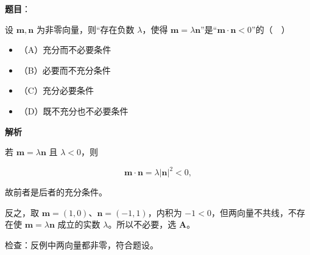 \begin{answer}

\textbf{题目}：

设 $\boldsymbol m,\boldsymbol n$ 为非零向量，则“存在负数 $\lambda$，使得 $\boldsymbol m=\lambda\boldsymbol n$”是“$\boldsymbol m\cdot\boldsymbol n<0$”的（　）

\begin{itemize}
\item （A）充分而不必要条件
\item （B）必要而不充分条件
\item （C）充分必要条件
\item （D）既不充分也不必要条件
\end{itemize}

\textbf{解析}

若 $\boldsymbol m=\lambda\boldsymbol n$ 且 $\lambda<0$，则

\nopagebreak[4]
\[\boldsymbol m\cdot\boldsymbol n=\lambda|\boldsymbol n|^2<0,\]

故前者是后者的充分条件。

反之，取 $\boldsymbol m=(1,0)$、$\boldsymbol n=(-1,1)$，内积为 $-1<0$，但两向量不共线，不存在使 $\boldsymbol m=\lambda\boldsymbol n$ 成立的实数 $\lambda$。所以不必要，选 \textbf{A}。

检查：反例中两向量都非零，符合题设。


\end{answer}

